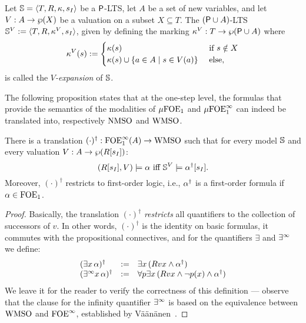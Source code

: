 \begin{definition}\label{def:exp}
Let $\mathbb{S} = \langle{T,R,\kappa, s_I}\rangle$ be a $\mathsf{P}$-LTS, let $A$ be a set of
new variables, and let $V: A \to \wp(X)$ be a valuation on a subset $X\subseteq
T$. 
The $(\mathsf{P}\cup A)$-LTS $\mathbb{S}^{V}\mathrel{:=} \langle{T,R,\kappa^V, s_I}\rangle$, given by 
defining the marking $\kappa^V: T \to \wp{(\mathsf{P}\cup A)}$ where
\[\kappa^V(s)\mathrel{:=}  
\begin{cases} \kappa(s) & \text{ if } s \notin X \\
\kappa(s) \cup \{ a \in A \mid s \in V(a)\}& \text{ else,}
\end{cases}\]
is called the \emph{$V$-expansion} of $\mathbb{S}$.
\end{definition}

The following proposition states that at the one-step level, the formulas that 
provide the semantics of the modalities of $\mu\mathrm{FOE}_1$ and $\mu\mathrm{FOE}^{\infty}_1$ can indeed 
be translated into, respectively $\mathrm{NMSO}$ and $\mathrm{WMSO}$.

\begin{proposition}
\label{p:1trl}
There is a translation $(\cdot)^{\dag}: \mathrm{FOE}^{\infty}_1(A) \to \mathrm{WMSO}$ such that for every 
model $\mathbb{S}$ and every valuation $V: A \to \wp(R[s_{I}])$:
\[
(R[s_{I}],V) \models \alpha \text{ iff } \mathbb{S}^{V} \models \alpha^{\dag}[s_{I}].
\]
Moreover, $(\cdot)^{\dag}$ restricts to first-order logic, i.e., $\alpha^{\dag}$ is
a first-order formula if $\alpha \in \mathrm{FOE}_1$.
\end{proposition}


\begin{proof}
Basically, the translation $(\cdot)^{\dag}$ \emph{restricts} all quantifiers
to the collection of successors of $v$.
In other words, $(\cdot)^{\dag}$ is the identity on basic formulas, it commutes
with the propositional connectives, and for the quantifiers $\exists$ and $\exists^\infty$
we define:
\[\begin{array}{lll}
(\exists x\, \alpha)^{\dag} &\mathrel{: =}& \exists x\, (Rvx \land \alpha^{\dag})
\\ (\exists^\infty x\, \alpha)^{\dag}  &\mathrel{: =}& \forall p \exists x\, (Rvx \land \neg p(x) 
    \land \alpha^{\dag})
\end{array}\]
We leave it for the reader to verify the correctness of this definition ---
observe that the clause for the infinity quantifier $\exists^\infty$ is based on the 
equivalence between $\mathrm{WMSO}$ and $\mathrm{FOE}^{\infty}$, established by 
V\"a\"an\"anen~\cite{vaananen77}.
\end{proof}

